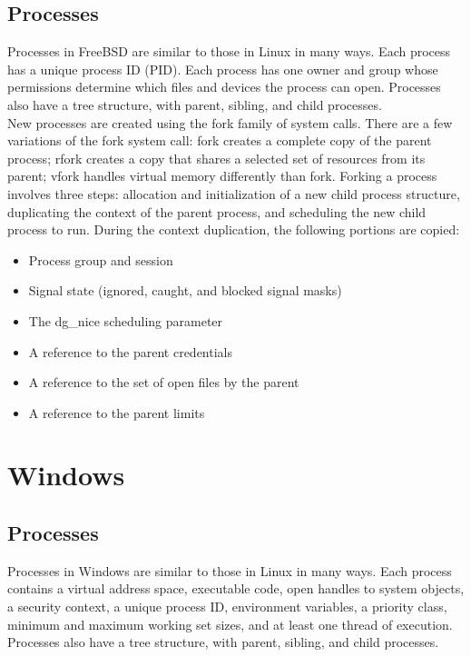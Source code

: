 \documentclass[letterpaper,draftclsnofoot,10pt,onecolumn,titlepage]{IEEEtran}\usepackage[margin=0.75in]{geometry}
\begin{document}
    \subsection{Processes}
    Processes in FreeBSD are similar to those in Linux in many ways. Each process has a unique process ID (PID). Each
    process has one owner and group whose permissions determine which files and devices the process can open. Processes
    also have a tree structure, with parent, sibling, and child processes.
    \\
    New processes are created using the fork family of system calls. There are a few variations of the fork system call:
    fork creates a complete copy of the parent process; rfork creates a copy that shares a selected set of resources from
    its parent; vfork handles virtual memory differently than fork. Forking a process involves three steps: allocation and
    initialization of a new child process structure, duplicating the context of the parent process, and scheduling the 
    new child process to run. During the context duplication, the following portions are copied:
    \begin{itemize}
    	\item Process group and session
	\item Signal state (ignored, caught, and blocked signal masks)
	\item The dg\_nice scheduling parameter 
	\item A reference to the parent credentials
	\item A reference to the set of open files by the parent
	\item A reference to the parent limits
    \end{itemize}


\section{Windows}
    \subsection{Processes}
    Processes in Windows are similar to those in Linux in many ways. Each process contains a virtual address space,
    executable code, open handles to system objects, a security context, a unique process ID, environment variables,
    a priority class, minimum and maximum working set sizes, and at least one thread of execution. Processes also
    have a tree structure, with parent, sibling, and child processes.
\end{document}
